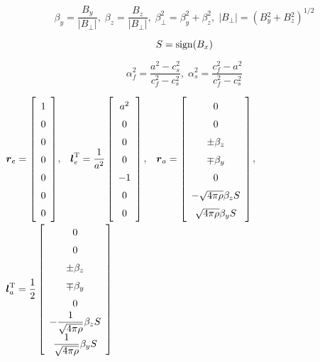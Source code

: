 \begin{equation}
\beta_{y} = \frac{{B}{}_{y}}{|{B}{}_{\bot} |}
, \;
\beta_{z} = \frac{{B}{}_{z}}{|{B}{}_{\bot} |} , \;
\beta_{\bot}^{2} = \beta_y^{2} + \beta_z^{2} , \;
|{B}{}_{\bot} | = ( {B}{}_{y}^{2} +
{B}{}_{z}^{2} ) ^{1/2}
\end{equation}

\begin{equation}
S = {\rm sign} (B_{x})
\end{equation}

\begin{equation}
\alpha_{f}^2 = \frac{a^2 - c_{s}^2}{c_{f}^2 - c_{s}^2}
, \;
\alpha_{s}^2 = \frac{c_{f}^2 - a^2}{c_{f}^2 - c_{s}^2}
\end{equation}

\newpage

\begin{center}
$\renewcommand{\arraystretch}{1.5}
\mbox{\boldmath $r$}_{e} =
\left[
\begin{array}{c}
1 \\
0 \\
0 \\
0 \\
0 \\
0 \\
0 \\
\end{array}
\right]$, $\;$
$\renewcommand{\arraystretch}{1.5}
\displaystyle
\mbox{\boldmath $l$}_{e}^{\rm T} =
\frac{1}{a^2}
\left[
\begin{array}{c}
a^2 \\
0 \\
0 \\
0 \\
-1 \\
0 \\
0 \\
\end{array}
\right]$, $\;$
$\renewcommand{\arraystretch}{1.5}
\mbox{\boldmath $r$}_{a} =
\left[
\begin{array}{c}
0 \\
0 \\
\pm \beta_{z} \\
\mp \beta_{y} \\
0 \\
- \sqrt{4\pi\rho}\beta_z S\\ 
\sqrt{4\pi\rho}\beta_y S\\ 
\end{array} 
\right]$, $\;$
$\renewcommand{\arraystretch}{1.5}
\displaystyle
\mbox{\boldmath $l$}_{a}^{\rm T} =
\frac{1}{2}
\left[
\begin{array}{c}
0 \\
0 \\
\pm \beta_{z} \\
\mp \beta_{y} \\
0 \\
\displaystyle - \frac1{\sqrt{4\pi\rho}}\beta_z S \\ 
\displaystyle \frac1{\sqrt{4\pi\rho}}\beta_y S \\ 
\end{array}
\right]$ 
\end{center}


